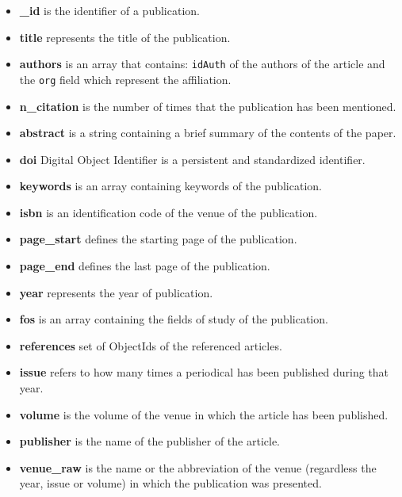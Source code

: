 \documentclass{Configuration_Files/PoliMi3i_thesis}
\begin{document}
\begin{itemize}
    \item \textbf{\_id} is the identifier of a publication.
    \item \textbf{title} represents the title of the publication.
    \item \textbf{authors} is an array that contains: \verb |idAuth| of the authors of the article and the \verb |org|
        field which represent the affiliation.
    \item \textbf{n\_citation} is the number of times that the publication has been mentioned.
    \item \textbf{abstract} is a string containing a brief summary of the contents of the paper.
    \item \textbf{doi} Digital Object Identifier is a persistent and standardized identifier.
    \item \textbf{keywords} is an array containing keywords of the publication.
    \item \textbf{isbn} is an identification code of the venue of the publication.
    \item \textbf{page\_start} defines the starting page of the publication.
    \item \textbf{page\_end} defines the last page of the publication.
    \item \textbf{year} represents the year of publication.
    \item \textbf{fos} is an array containing the fields of study of the publication.
    \item \textbf{references} set of ObjectIds of the referenced articles.
    \item \textbf{issue} refers to how many times a periodical has been published during that year.
    \item \textbf{volume} is the volume of the venue in which the article has been published.
    \item \textbf{publisher} is the name of the publisher of the article.
    \item \textbf{venue\_raw} is the name or the abbreviation of the venue (regardless the year, issue or volume) in which the
        publication was presented.
\end{itemize}
\end{document}

